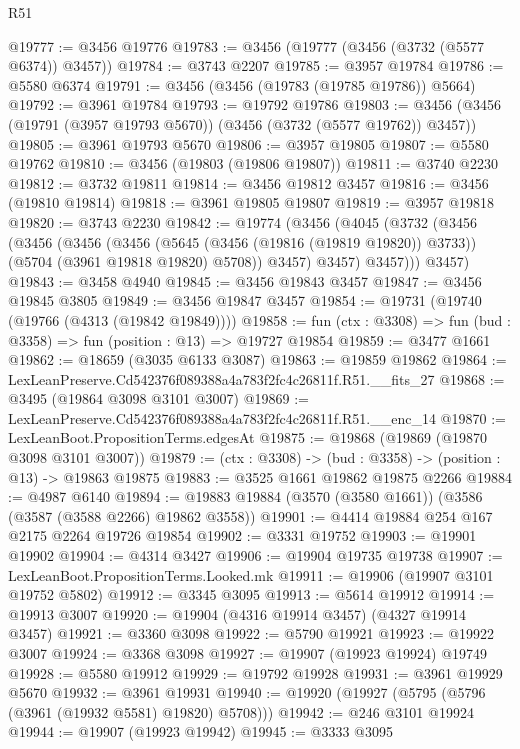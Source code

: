 \begin{lexlean}{R51}
\begin{coremodule}
@19777 := @3456 @19776
@19783 := @3456 (@19777 (@3456 (@3732 (@5577 @6374)) @3457))
@19784 := @3743 @2207
@19785 := @3957 @19784
@19786 := @5580 @6374
@19791 := @3456 (@3456 (@19783 (@19785 @19786)) @5664)
@19792 := @3961 @19784
@19793 := @19792 @19786
@19803 := @3456 (@3456 (@19791 (@3957 @19793 @5670)) (@3456 (@3732 (@5577 @19762)) @3457))
@19805 := @3961 @19793 @5670
@19806 := @3957 @19805
@19807 := @5580 @19762
@19810 := @3456 (@19803 (@19806 @19807))
@19811 := @3740 @2230
@19812 := @3732 @19811
@19814 := @3456 @19812 @3457
@19816 := @3456 (@19810 @19814)
@19818 := @3961 @19805 @19807
@19819 := @3957 @19818
@19820 := @3743 @2230
@19842 := @19774
    (@3456
      (@4045
        (@3732
          (@3456
            (@3456
              (@3456
                (@3456
                  (@5645 (@3456 (@19816 (@19819 @19820)) @3733))
                  (@5704 (@3961 @19818 @19820) @5708))
                @3457)
              @3457)
            @3457)))
      @3457)
@19843 := @3458 @4940
@19845 := @3456 @19843 @3457
@19847 := @3456 @19845 @3805
@19849 := @3456 @19847 @3457
@19854 := @19731 (@19740 (@19766 (@4313 (@19842 @19849))))
@19858 := fun (ctx : @3308) => fun (bud : @3358) => fun (position : @13) => @19727 @19854
@19859 := @3477 @1661
@19862 := @18659 (@3035 @6133 @3087)
@19863 := @19859 @19862
@19864 := LexLeanPreserve.Cd542376f089388a4a783f2fc4c26811f.R51.__fits_27
@19868 := @3495 (@19864 @3098 @3101 @3007)
@19869 := LexLeanPreserve.Cd542376f089388a4a783f2fc4c26811f.R51.__enc_14
@19870 := LexLeanBoot.PropositionTerms.edgesAt
@19875 := @19868 (@19869 (@19870 @3098 @3101 @3007))
@19879 := (ctx : @3308) -> (bud : @3358) -> (position : @13) -> @19863 @19875
@19883 := @3525 @1661 @19862 @19875 @2266
@19884 := @4987 @6140
@19894 := @19883 @19884 (@3570 (@3580 @1661)) (@3586 (@3587 (@3588 @2266) @19862 @3558))
@19901 := @4414 @19884 @254 @167 @2175 @2264 @19726 @19854
@19902 := @3331 @19752
@19903 := @19901 @19902
@19904 := @4314 @3427
@19906 := @19904 @19735 @19738
@19907 := LexLeanBoot.PropositionTerms.Looked.mk
@19911 := @19906 (@19907 @3101 @19752 @5802)
@19912 := @3345 @3095
@19913 := @5614 @19912
@19914 := @19913 @3007
@19920 := @19904 (@4316 @19914 @3457) (@4327 @19914 @3457)
@19921 := @3360 @3098
@19922 := @5790 @19921
@19923 := @19922 @3007
@19924 := @3368 @3098
@19927 := @19907 (@19923 @19924) @19749
@19928 := @5580 @19912
@19929 := @19792 @19928
@19931 := @3961 @19929 @5670
@19932 := @3961 @19931
@19940 := @19920 (@19927 (@5795 (@5796 (@3961 (@19932 @5581) @19820) @5708)))
@19942 := @246 @3101 @19924
@19944 := @19907 (@19923 @19942)
@19945 := @3333 @3095

\end{coremodule}
\end{lexlean}
